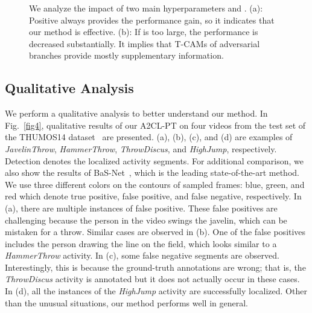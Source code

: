 \documentclass[runningheads]{llncs}
\newcommand{\tcam}{\mbox{T-CAM}}
\newcommand{\thumos}{\mbox{THUMOS14}}
\newcommand{\ourlossname}{\mbox{A2CL-PT}}
\begin{document}
\begin{figure}[t]
  \adjustbox{valign=t}{\begin{minipage}[t]{0.47\columnwidth}
  \small
    \texttt{[image: 3a.PNG]}\-0.5ex] \hspace*{9.48em}(b)
  \end{minipage}}
  \caption{We analyze the impact of two main hyperparameters  and . (a): Positive  always provides the performance gain, so it indicates that our method is effective. (b): If  is too large, the performance is decreased substantially. It implies that \tcam{}s of adversarial branches provide mostly supplementary information.}
  \label{fig3}
\end{figure}

\subsection{Qualitative Analysis}
We perform a qualitative analysis to better understand our method. In Fig.~\ref{fig4}, qualitative results of our \ourlossname{} on four videos from the test set of the \thumos{} dataset~\cite{THUMOS14} are presented. (a), (b), (c), and (d) are examples of \textit{JavelinThrow}, \textit{HammerThrow}, \textit{ThrowDiscus}, and \textit{HighJump}, respectively. Detection denotes the localized activity segments. For additional comparison, we also show the results of \mbox{BaS-Net}~\cite{lee2020background}, which is the leading state-of-the-art method. We use three different colors on the contours of sampled frames: blue, green, and red which denote true positive, false positive, and false negative, respectively. In (a), there are multiple instances of false positive. These false positives are challenging because the person in the video swings the javelin, which can be mistaken for a throw. Similar cases are observed in (b). One of the false positives includes the person drawing the line on the field, which looks similar to a \textit{HammerThrow} activity. In (c), some false negative segments are observed. Interestingly, this is because the ground-truth annotations are wrong; that is, the \textit{ThrowDiscus} activity is annotated but it does not actually occur in these cases. In (d), all the instances of the \textit{HighJump} activity are successfully localized. Other than the unusual situations, our method performs well in general.
\end{document}
